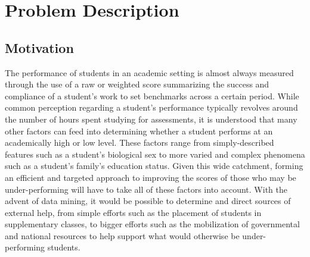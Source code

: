 \section{Problem Description}
\subsection{Motivation}
The performance of students in an academic setting is almost always measured through the use of a raw or weighted score summarizing the success and compliance of a student's work to set benchmarks across a certain period. While common perception regarding a student's performance typically revolves around the number of hours spent studying for assessments, it is understood that many other factors can feed into determining whether a student performs at an academically high or low level. These factors range from simply-described features such as a student's biological sex to more varied and complex phenomena such as a student's family's education status. Given this wide catchment, forming an efficient and targeted approach to improving the scores of those who may be under-performing will have to take all of these factors into account. With the advent of data mining, it would be possible to determine and direct sources of external help, from simple efforts such as the placement of students in supplementary classes, to bigger efforts such as the mobilization of governmental and national resources to help support what would otherwise be under-performing students.


